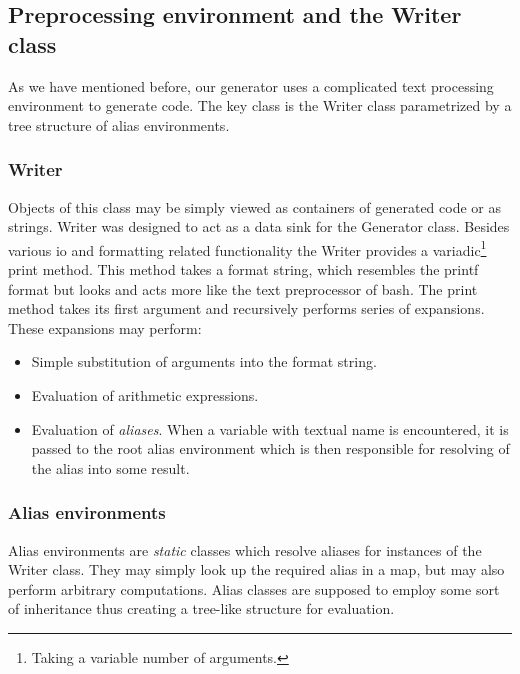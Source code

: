 \subsection{Preprocessing environment and the Writer class}

As we have mentioned before, our generator uses a complicated text processing environment to generate code. The key class is the Writer class parametrized by a tree structure of alias environments. 

\subsubsection{Writer}
Objects of this class may be simply viewed as containers of generated code or as strings. Writer was designed to act as a data sink for the Generator class. Besides various io and formatting related functionality the Writer provides a variadic\footnote{Taking a variable number of arguments.} print method. This method takes a format string, which resembles the printf format but looks and acts more like the text preprocessor of bash. The print method takes its first argument and recursively performs series of expansions. These expansions may perform:
\begin{itemize}
  \item Simple substitution of arguments into the format string.
  \item Evaluation of arithmetic expressions. 
  \item Evaluation of \emph{aliases}. When a variable with textual name is encountered, it is passed to the root alias environment which is then responsible for resolving of the alias into some result.
\end{itemize}

\subsubsection{Alias environments}
Alias environments are \emph{static} classes which resolve aliases for instances of the Writer class. They may simply look up the required alias in a map, but may also perform arbitrary computations. Alias classes are supposed to employ some sort of inheritance thus creating a tree-like structure for evaluation.


